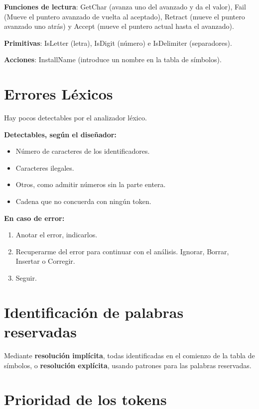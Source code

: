 \documentclass[12pt, twoside, openright]{report} %
\begin{document}
\textbf{Funciones de lectura}: GetChar (avanza uno del avanzado y da el
valor), Fail (Mueve el puntero avanzado de vuelta al aceptado),
Retract (mueve el puntero avanzado uno atrás) y Accept (mueve el puntero
actual hasta el avanzado).

\textbf{Primitivas}: IsLetter (letra), IsDigit (número) e IsDelimiter (separadores).

\textbf{Acciones}: InstallName (introduce un nombre en la tabla de
símbolos).


\section{Errores Léxicos}

Hay pocos detectables por el analizador léxico.

\textbf{Detectables, según el diseñador:}

\begin{itemize}

\item
  Número de caracteres de los identificadores.
\item
  Caracteres ilegales.
\item
  Otros, como admitir números sin la parte entera.
\item
  Cadena que no concuerda con ningún token.
\end{itemize}

\textbf{En caso de error:}

\begin{enumerate}
\def\labelenumi{\arabic{enumi}.}

\item
  Anotar el error, indicarlos.
\item
  Recuperarme del error para continuar con el análisis. Ignorar, Borrar,
  Insertar o Corregir.
\item
  Seguir.
\end{enumerate}


\section{Identificación de palabras reservadas}

Mediante \textbf{resolución implícita}, todas identificadas en el
comienzo de la tabla de símbolos, o \textbf{resolución explícita},
usando patrones para las palabras reservadas.


\section{Prioridad de los tokens}
\end{document}
